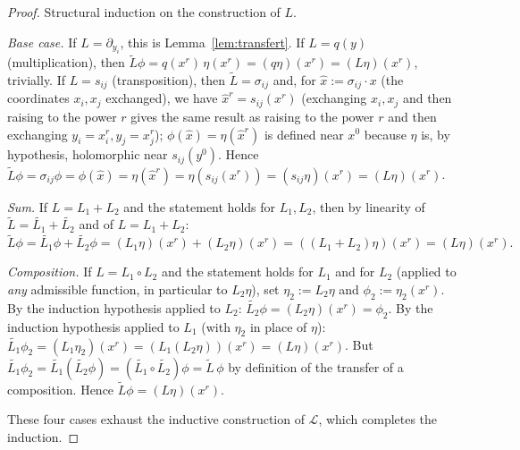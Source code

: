 \documentclass[10pt,a4paper]{amsart}
\begin{document}
\begin{proof}
Structural induction on the construction of $L$.

\emph{Base case.} If $L=\partial_{y_i}$, this is Lemma~\ref{lem:transfert}. If $L=q(y)$ (multiplication), then $\widetilde L\phi = q(x^r)\,\eta(x^r) = (q\eta)(x^r) = (L\eta)(x^r)$, trivially. If $L=s_{ij}$ (transposition), then $\widetilde L=\sigma_{ij}$ and, for $\hat x:=\sigma_{ij}\cdot x$ (the coordinates $x_i,x_j$ exchanged), we have $\hat x^r = s_{ij}(x^r)$ (exchanging $x_i,x_j$ and then raising to the power $r$ gives the same result as raising to the power $r$ and then exchanging $y_i=x_i^r,y_j=x_j^r$); $\phi(\hat x)=\eta(\hat x^r)$ is defined near $x^0$ because $\eta$ is, by hypothesis, holomorphic near $s_{ij}(y^0)$. Hence $\widetilde L\phi = \sigma_{ij}\phi = \phi(\hat x) = \eta(\hat x^r) = \eta(s_{ij}(x^r)) = (s_{ij}\eta)(x^r) = (L\eta)(x^r)$.

\emph{Sum.} If $L=L_1+L_2$ and the statement holds for $L_1,L_2$, then by linearity of $\widetilde L=\widetilde{L_1}+\widetilde{L_2}$ and of $L=L_1+L_2$:
\[
\widetilde L\phi = \widetilde{L_1}\phi+\widetilde{L_2}\phi = (L_1\eta)(x^r)+(L_2\eta)(x^r) = ((L_1+L_2)\eta)(x^r) = (L\eta)(x^r).
\]

\emph{Composition.} If $L=L_1\circ L_2$ and the statement holds for $L_1$ and for $L_2$ (applied to \emph{any} admissible function, in particular to $L_2\eta$), set $\eta_2:=L_2\eta$ and $\phi_2:=\eta_2(x^r)$. By the induction hypothesis applied to $L_2$: $\widetilde{L_2}\phi=(L_2\eta)(x^r)=\phi_2$. By the induction hypothesis applied to $L_1$ (with $\eta_2$ in place of $\eta$): $\widetilde{L_1}\phi_2 = (L_1\eta_2)(x^r) = (L_1(L_2\eta))(x^r)=(L\eta)(x^r)$. But $\widetilde{L_1}\phi_2 = \widetilde{L_1}(\widetilde{L_2}\phi) = (\widetilde{L_1}\circ\widetilde{L_2})\phi = \widetilde L\,\phi$ by definition of the transfer of a composition. Hence $\widetilde L\phi=(L\eta)(x^r)$.

These four cases exhaust the inductive construction of $\mathcal L$, which completes the induction.
\end{proof}
\end{document}
